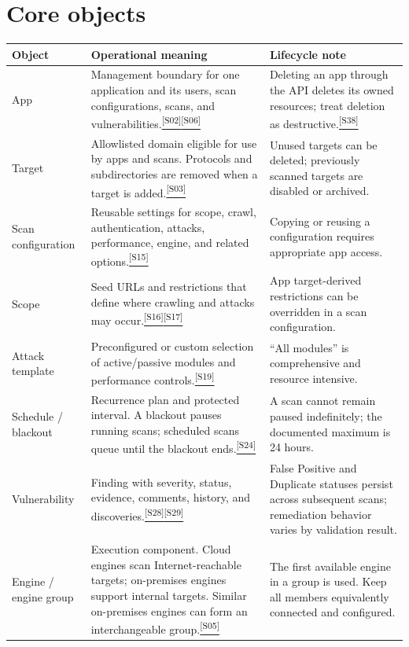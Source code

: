\documentclass[11pt,letterpaper,oneside]{scrreprt}
\newcommand{\src}[1]{\hyperref[src:#1]{\textsuperscript{\color{R7Orange}[#1]}}}
\begin{document}
\section{Core objects}
\begin{tabularx}{\textwidth}{@{}P{1.4in}Y P{2.0in}@{}}
\toprule
\textbf{Object} & \textbf{Operational meaning} & \textbf{Lifecycle note}\\
\midrule
App & Management boundary for one application and its users, scan configurations, scans, and vulnerabilities.\src{S02}\src{S06} & Deleting an app through the API deletes its owned resources; treat deletion as destructive.\src{S38}\\
Target & Allowlisted domain eligible for use by apps and scans. Protocols and subdirectories are removed when a target is added.\src{S03} & Unused targets can be deleted; previously scanned targets are disabled or archived.\\
Scan configuration & Reusable settings for scope, crawl, authentication, attacks, performance, engine, and related options.\src{S15} & Copying or reusing a configuration requires appropriate app access.\\
Scope & Seed URLs and restrictions that define where crawling and attacks may occur.\src{S16}\src{S17} & App target-derived restrictions can be overridden in a scan configuration.\\
Attack template & Preconfigured or custom selection of active/passive modules and performance controls.\src{S19} & ``All modules'' is comprehensive and resource intensive.\\
Schedule / blackout & Recurrence plan and protected interval. A blackout pauses running scans; scheduled scans queue until the blackout ends.\src{S24} & A scan cannot remain paused indefinitely; the documented maximum is 24 hours.\\
Vulnerability & Finding with severity, status, evidence, comments, history, and discoveries.\src{S28}\src{S29} & False Positive and Duplicate statuses persist across subsequent scans; remediation behavior varies by validation result.\\
Engine / engine group & Execution component. Cloud engines scan Internet-reachable targets; on-premises engines support internal targets. Similar on-premises engines can form an interchangeable group.\src{S05} & The first available engine in a group is used. Keep all members equivalently connected and configured.\\
\bottomrule
\end{tabularx}
\end{document}
